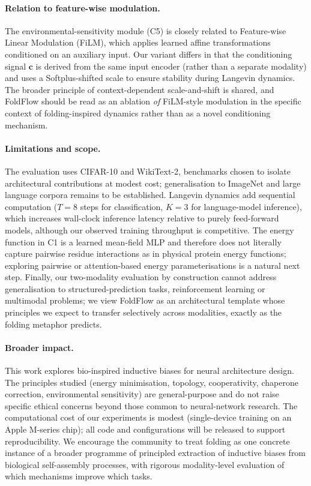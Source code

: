 \documentclass[fleqn,10pt]{article}
\newcommand{\bc}{\mathbf{c}}
\begin{document}
\paragraph{Relation to feature-wise modulation.}
The environmental-sensitivity module (C5) is closely related to
Feature-wise Linear Modulation (FiLM),\cite{perez2018film} which
applies learned affine transformations conditioned on an auxiliary
input. Our variant differs in that the conditioning signal $\bc$ is
derived from the same input encoder (rather than a separate
modality) and uses a Softplus-shifted scale to ensure stability
during Langevin dynamics. The broader principle of
context-dependent scale-and-shift is shared, and FoldFlow should be
read as an ablation \emph{of} FiLM-style modulation in the specific
context of folding-inspired dynamics rather than as a novel
conditioning mechanism.

\paragraph{Limitations and scope.}
The evaluation uses CIFAR-10 and WikiText-2, benchmarks chosen to
isolate architectural contributions at modest cost; generalisation
to ImageNet and large language corpora remains to be established.
Langevin dynamics add sequential computation ($T{=}8$ steps for
classification, $K{=}3$ for language-model inference), which
increases wall-clock inference latency relative to purely
feed-forward models, although our observed training throughput is
competitive. The energy function in C1 is a learned mean-field MLP
and therefore does not literally capture pairwise residue
interactions as in physical protein energy functions; exploring
pairwise or attention-based energy parameterisations is a natural
next step. Finally, our two-modality evaluation by construction
cannot address generalisation to structured-prediction tasks,
reinforcement learning or multimodal problems; we view FoldFlow as
an architectural template whose principles we expect to transfer
selectively across modalities, exactly as the folding metaphor
predicts.

\paragraph{Broader impact.}
This work explores bio-inspired inductive biases for neural
architecture design. The principles studied (energy minimisation,
topology, cooperativity, chaperone correction, environmental
sensitivity) are general-purpose and do not raise specific ethical
concerns beyond those common to neural-network research. The
computational cost of our experiments is modest (single-device
training on an Apple M-series chip); all code and configurations
will be released to support reproducibility. We encourage the
community to treat folding as one concrete instance of a broader
programme of principled extraction of inductive biases from
biological self-assembly processes, with rigorous modality-level
evaluation of which mechanisms improve which tasks.
\end{document}

